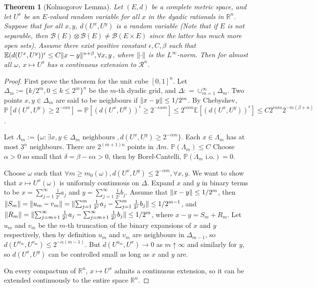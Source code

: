 \documentclass[openany,oneside]{book}
\newtheorem{thm}{Theorem}[section]
\theoremstyle{definition}
\theoremstyle{remark}
\newcommand{\E}{\mathbb{E}} %
\renewcommand{\P}{\mathbb{P}} %
\DeclarePairedDelimiter{\norm}{\lVert}{\rVert} %
\begin{document}
\begin{thm}[Kolmogorov Lemma]
Let $(E,d)$ be a complete metric space, and let $U^x$ be an $E$-valued random variable for all $x$ in the dyadic rationals in $\mathbb{R}^n$. Suppose that for all $x,y$, $d(U^x,U^y)$ is a random variable (Note that if $E$ is not separable, then $\mathcal{B}(E) \otimes \mathcal{B}(E) \ne \mathcal{B}(E\times E)$ since the latter has much more open sets). Assume there exist positive constant $\epsilon, C, \beta$ such that $\E(d(U^x,U^y))^\epsilon \le C\norm{x-y}^{n+\beta}, \forall x,y$, where $\norm{\cdot}$ is the $L^\infty$-norm. Then for almost all $\omega$, $x\mapsto U^x$ has a continuous extension to $\mathcal{R}^n$.
\end{thm}
\begin{proof}
First prove the theorem for the unit cube $[0,1]^n$. Let $\Delta_m :=\{k/2^m, 0\le k \le 2^m \}^n$ be the $m$-th dyadic grid, and $\Delta: = \cup_{m=1}^\infty \Delta_m$. Two points $x,y \in \Delta_m$ are said to be neighbours if $\norm{x-y} \le 1/2^m$. By Chebyshev, $\P[d(U^x,U^y) \ge 2^{-\alpha m}] = \P[(d(U^x,U^y))^\epsilon \ge 2^{-\epsilon \alpha m}] \le 2^{\epsilon \alpha m} \E[(d(U^x,U^y))^\epsilon] \le C 2^{\epsilon \alpha m} 2^{-m(\beta+n)}$.
\par
Let $\Lambda_m := \{\omega : \exists x,y \in \Delta_m \textrm{ neighbours }, d(U^x,U^y) \ge 2^{-\alpha m}\}$. Each $x\in \Lambda_m$ has at most $3^n$ neighbours. There are $2^{(m+1)n}$ points in $\Lambda m$. $\P(\Lambda_m) \le C$
Choose $\alpha>0$ so small that $\delta = \beta - \epsilon \alpha >0$, then by Borel-Cantelli, $\P(\Lambda_m \textrm{ i.o.}) =0$.
\par
Choose $\omega$ such that $\forall m\ge m_0(\omega), d(U^x,U^y) \le 2^{-\alpha m}, \forall x,y$. We want to show that $x\mapsto U^x(\omega)$ is uniformly continuous on $\Delta$. Expand $x$ and $y$ in binary terms to be $x=\sum_{j=1}^\infty \frac{1}{2^j} a_j$ and $y=\sum_{j=1}^\infty \frac{1}{2^j} b_j$. Assume that $\norm{x-y} \le 1/2^m$, then $\norm{S_m} = \norm{u_m - v_m} = \norm{\sum_{j=1}^m \frac{1}{2^j} a_j - \sum_{j=1}^m \frac{1}{2^j} b_j} \le 1/2^{m-1}$, and $\norm{R_m} = \norm{\sum_{j=m+1}^\infty \frac{1}{2^j} a_j - \sum_{j=m+1}^\infty \frac{1}{2^j} b_j} \le 1/2^{m}$, where $x-y=S_m + R_m$. Let $u_m$ and $v_m$ be the $m$-th truncation of the binary expansions of $x$ and $y$ respectively, then by definition $u_m$ and $v_m$ are neighbours in $\Delta_{m-1}$, so $d(U^{u_m}, U^{v_m}) \le 2^{-\alpha(m-1)}$. But $d(U^{u_m},U^x) \to 0$ as $m\uparrow \infty$ and similarly for $y$, so $d(U^x,U^y)$ can be controlled small as long as $x$ and $y$ are.
\par
On every compactum of $\mathbb{R}^n$, $x\mapsto U^x$ admits a continuous extension, so it can be extended continuously to the entire space $\mathbb{R}^n$.
\end{proof}
\end{document}
